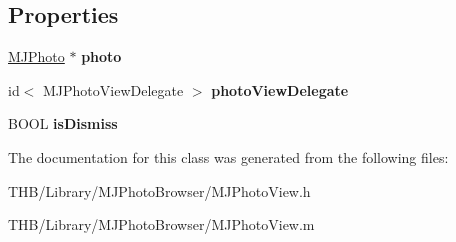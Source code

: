 \subsection*{Properties}
\begin{DoxyCompactItemize}
\item 
\mbox{\label{interface_m_j_photo_view_aaec0b416915aa60b064494ca51d173c3}} 
\mbox{\hyperlink{interface_m_j_photo}{M\+J\+Photo}} $\ast$ {\bfseries photo}
\item 
\mbox{\label{interface_m_j_photo_view_a4c6dabc817387f08de97735e32d3892f}} 
id$<$ M\+J\+Photo\+View\+Delegate $>$ {\bfseries photo\+View\+Delegate}
\item 
\mbox{\label{interface_m_j_photo_view_a8f5e9834bdb22f9f890fb6950e3c860c}} 
B\+O\+OL {\bfseries is\+Dismiss}
\end{DoxyCompactItemize}


The documentation for this class was generated from the following files\+:\begin{DoxyCompactItemize}
\item 
T\+H\+B/\+Library/\+M\+J\+Photo\+Browser/M\+J\+Photo\+View.\+h\item 
T\+H\+B/\+Library/\+M\+J\+Photo\+Browser/M\+J\+Photo\+View.\+m\end{DoxyCompactItemize}
